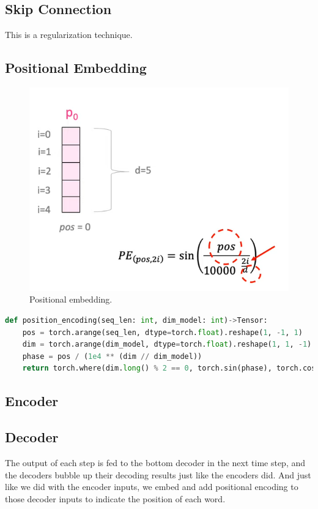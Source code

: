 \subsection{Skip Connection}
This is a regularization technique.

\subsection{Positional Embedding}

\begin{figure}[t]
	\centering
	\includegraphics[scale=0.6]{./images/transformer/positional_1.png}
	\caption{Positional embedding.}
\end{figure}


\begin{lstlisting}[language=Python]
def position_encoding(seq_len: int, dim_model: int)->Tensor:
    pos = torch.arange(seq_len, dtype=torch.float).reshape(1, -1, 1)
    dim = torch.arange(dim_model, dtype=torch.float).reshape(1, 1, -1)
    phase = pos / (1e4 ** (dim // dim_model))
    return torch.where(dim.long() % 2 == 0, torch.sin(phase), torch.cos(phase))
\end{lstlisting}

\subsection{Encoder}

\subsection{Decoder}
The output of each step is fed to the bottom decoder in the next time step, and the decoders bubble up their decoding results just like the encoders did. And just like we did with the encoder inputs, we embed and add positional encoding to those decoder inputs to indicate the position of each word.

